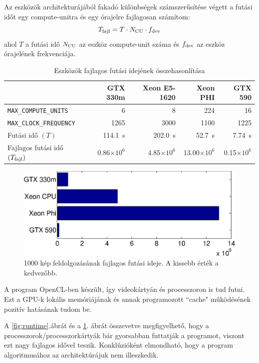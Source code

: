 	Az eszközök architekturájából fakadó különbségek számszerűsítése végett a futási időt egy compute-unitra és egy
	órajelre fajlagosan számítom:
	\begin{equation}
	T_{\rm fajl} = T \cdot N_{\rm CU} \cdot f_{\rm dev}
	\end{equation}
	ahol $T$ a futási idő $N_{\rm CU}$ az eszköz compute-unit száma és $f_{\rm dev}$ az eszköz órajelének frekvenciája.
        
	\begin{table}[H]
	\footnotesize
	\centering
	
	\setlength{\extrarowheight}{3pt}
	\begin{tabular}{ l | r | r | r | r}
		 & GTX 330m & Xeon E5-1620 & Xeon PHI & GTX 590\\ \hline
		\texttt{MAX\_COMPUTE\_UNITS} & 6 & 8 & 224 & 16\\
		\texttt{MAX\_CLOCK\_FREQUENCY} & 1265 & 3000 & 1100 & 1225\\\hline\hline
		Futási idő $(T)$ & 114.1~s & 202.0~s & 52.7~s & 7.74~s\\
		Fajlagos futási idő $(T_{\rm fajl})$ & 0.86$\times 10^6$ & 4.85$\times 10^6$ & 13.00$\times 10^6$ & 0.15$\times 10^6$
	\end{tabular}
	
	\caption{Eszközök fajlagos futási idejének összehasonlítása}
	\label{table:results_f}
	\end{table}	
	
	\begin{figure}[!h]
	\begin{center}
	  \includegraphics[width=0.9\columnwidth]{figures/eps/runtime_f.eps}
	  \caption{1000 kép feldolgozásának fajlagos futási ideje. A kissebb érték a kedvezőbb.}
	  \label{fig:runtime_f}
	\end{center}
	\end{figure}
	
	A program OpenCL-ben készült, így videokártyán és processzoron is tud futni.
	Ezt a GPU-k lokális memóriájának és annak programozott ``cache" működésének pozitív hatásának tudom be.
	
	A \ref{fig:runtime}.ábrát és a \ref{fig:runtime_f}. ábrát összevetve megfigyelhető, hogy a processzorok/processzorkártyák bár
	gyorsabban futtatják a programot, viszont ezt nagy fajlagos idővel teszik. Konklúzióként elmondható, hogy a program
	algoritmusához az architektúrájuk nem illeszkedik.
	
